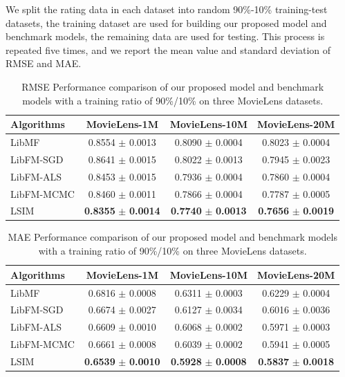 \documentclass{llncs}
\begin{document}
We split the rating data in each dataset into random 90\%-10\% training-test
datasets, the training dataset are used for building our proposed model
and benchmark models, the remaining data are used for testing.
This process is repeated five times, and we report the mean value and
standard deviation of RMSE and MAE.

\begin{table}[htbp]
	\centering
	\caption{RMSE Performance comparison of our proposed model and benchmark models
		with a training ratio of 90\%/10\% on three MovieLens datasets.}
	\label{tab:msre}
	\begin{tabular}{|l|c|c|c|}
		\hline
		\textbf{Algorithms} & \textbf{MovieLens-1M} & \textbf{MovieLens-10M} & \textbf{MovieLens-20M} \\
		\hline
		LibMF      & 0.8554 $\pm$ 0.0013 & 0.8090 $\pm$ 0.0004 & 0.8023 $\pm$ 0.0004 \\
		LibFM-SGD  & 0.8641 $\pm$ 0.0015 & 0.8022 $\pm$ 0.0013 & 0.7945 $\pm$ 0.0023 \\
		LibFM-ALS  & 0.8453 $\pm$ 0.0015 & 0.7936 $\pm$ 0.0004 & 0.7860 $\pm$ 0.0004 \\
		LibFM-MCMC & 0.8460 $\pm$ 0.0011 & 0.7866 $\pm$ 0.0004 & 0.7787 $\pm$ 0.0005 \\
		LSIM       & \textbf{0.8355} $\pm$ \textbf{0.0014} & \textbf{0.7740} $\pm$ \textbf{0.0013} & \textbf{0.7656} $\pm$ \textbf{0.0019} \\
		\hline
	\end{tabular}
\end{table}

\begin{table}[htbp]
	\centering
	\caption{MAE Performance comparison of our proposed model and benchmark models
		with a training ratio of 90\%/10\% on three MovieLens datasets.}
	\label{tab:mae}
	\begin{tabular}{|l|c|c|c|}
		\hline
		\textbf{Algorithms} & \textbf{MovieLens-1M} & \textbf{MovieLens-10M} & \textbf{MovieLens-20M} \\
		\hline
		LibMF      & 0.6816 $\pm$ 0.0008 & 0.6311 $\pm$ 0.0003 & 0.6229 $\pm$ 0.0004 \\
		LibFM-SGD  & 0.6674 $\pm$ 0.0027 & 0.6127 $\pm$ 0.0034 & 0.6016 $\pm$ 0.0036 \\
		LibFM-ALS  & 0.6609 $\pm$ 0.0010 & 0.6068 $\pm$ 0.0002 & 0.5971 $\pm$ 0.0003 \\
		LibFM-MCMC & 0.6661 $\pm$ 0.0008 & 0.6039 $\pm$ 0.0002 & 0.5941 $\pm$ 0.0005 \\
		LSIM       & \textbf{0.6539} $\pm$ \textbf{0.0010} & \textbf{0.5928} $\pm$ \textbf{0.0008} & \textbf{0.5837} $\pm$ \textbf{0.0018} \\
		\hline
	\end{tabular}
\end{table}
\end{document}
